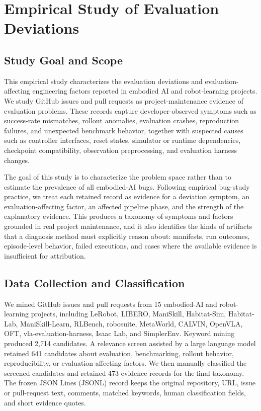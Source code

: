 \section{Empirical Study of Evaluation Deviations}
\label{sec:empirical-study}

\subsection{Study Goal and Scope}

This empirical study characterizes the evaluation deviations and evaluation-affecting engineering factors reported in embodied AI and robot-learning projects. We study GitHub issues and pull requests as project-maintenance evidence of evaluation problems. These records capture developer-observed symptoms such as success-rate mismatches, rollout anomalies, evaluation crashes, reproduction failures, and unexpected benchmark behavior, together with suspected causes such as controller interfaces, reset states, simulator or runtime dependencies, checkpoint compatibility, observation preprocessing, and evaluation harness changes.

The goal of this study is to characterize the problem space rather than to estimate the prevalence of all embodied-AI bugs. Following empirical bug-study practice, we treat each retained record as evidence for a deviation symptom, an evaluation-affecting factor, an affected pipeline phase, and the strength of the explanatory evidence. This produces a taxonomy of symptoms and factors grounded in real project maintenance, and it also identifies the kinds of artifacts that a diagnosis method must explicitly reason about: manifests, run outcomes, episode-level behavior, failed executions, and cases where the available evidence is insufficient for attribution.

\subsection{Data Collection and Classification}

We mined GitHub issues and pull requests from 15 embodied-AI and robot-learning projects, including LeRobot, LIBERO, ManiSkill, Habitat-Sim, Habitat-Lab, ManiSkill-Learn, RLBench, robosuite, MetaWorld, CALVIN, OpenVLA, OFT, vla-evaluation-harness, Isaac Lab, and SimplerEnv. Keyword mining produced 2,714 candidates. A relevance screen assisted by a large language model retained 641 candidates about evaluation, benchmarking, rollout behavior, reproducibility, or evaluation-affecting factors. We then manually classified the screened candidates and retained 473 evidence records for the final taxonomy. The frozen JSON Lines (JSONL) record keeps the original repository, URL, issue or pull-request text, comments, matched keywords, human classification fields, and short evidence quotes.

